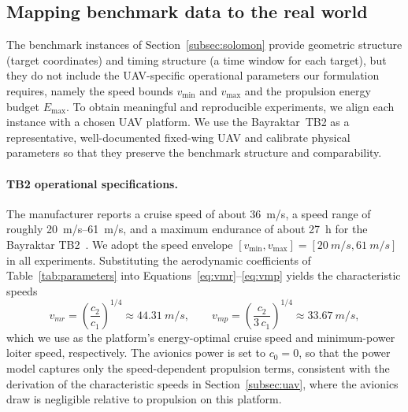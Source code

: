 \documentclass[11pt]{article}
\let\originalsubsection\subsection
\renewcommand{\subsection}{\FloatBarrier\originalsubsection}
\begin{document}
\subsection{Mapping benchmark data to the real world}\label{subsec:mapping}
 
The benchmark instances of Section~\ref{subsec:solomon} provide geometric structure (target coordinates) and timing structure (a time window for each target), but they do not include the UAV-specific operational parameters our formulation requires, namely the speed bounds $v_{\min}$ and $v_{\max}$ and the propulsion energy budget $E_{\max}$. To obtain meaningful and reproducible experiments, we align each instance with a chosen UAV platform. We use the Bayraktar~TB2 as a representative, well-documented fixed-wing UAV and calibrate physical parameters so that they preserve the benchmark structure and comparability.

\paragraph{TB2 operational specifications.}
The manufacturer reports a cruise speed of about \SI{36}{m/s}, a speed range of roughly \SIrange{20}{61}{m/s}, and a maximum endurance of about \SI{27}{h} for the Bayraktar TB2~\cite{baykar_tb2}. We adopt the speed envelope $[v_{\min}, v_{\max}] = [\SI{20}{m/s}, \SI{61}{m/s}]$ in all experiments. Substituting the aerodynamic coefficients of Table~\ref{tab:parameters} into Equations~\eqref{eq:vmr}--\eqref{eq:vmp} yields the characteristic speeds
\begin{equation}\label{eq:vmr-vmp-num}
v_{mr} = \left( \frac{c_2}{c_1} \right)^{\!1/4} \approx \SI{44.31}{m/s},
\qquad
v_{mp} = \left( \frac{c_2}{3\, c_1} \right)^{\!1/4} \approx \SI{33.67}{m/s},
\end{equation}
which we use as the platform's energy-optimal cruise speed and minimum-power loiter speed, respectively. The avionics power is set to $c_0 = 0$, so that the power model captures only the speed-dependent propulsion terms, consistent with the derivation of the characteristic speeds in Section~\ref{subsec:uav}, where the avionics draw is negligible relative to propulsion on this platform.
\end{document}
